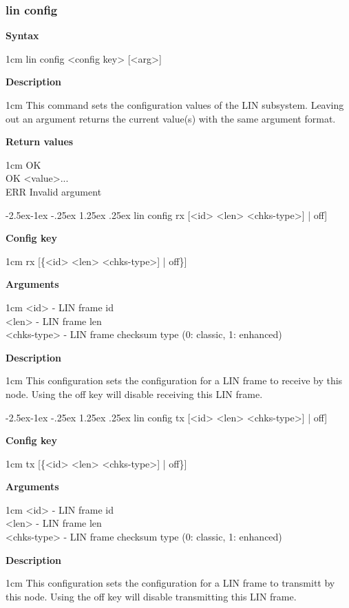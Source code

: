 \documentclass{article}[a4paper]
\makeatletter
\newcommand\subsubsubsection{\@startsection{paragraph}{4}{\z@}%
            {-2.5ex\@plus -1ex \@minus -.25ex}%
            {1.25ex \@plus .25ex}%
            {\normalfont\normalsize\bfseries}}
\makeatother
\begin{document}
\subsubsection{lin config}
\begin{tcolorbox}
	{\bf Syntax}

	 1cm \dimexpr\linewidth-2cm\relax
	lin config <config key> [<arg>]

	\medskip
	{\bf Description}

	 1cm \dimexpr\linewidth-2cm\relax
	This command sets the configuration values of the LIN subsystem.
	Leaving out an argument returns the current value(s) with the same argument
	format.

	\medskip
	{\bf Return values}

	 1cm \dimexpr\linewidth-2cm\relax
	OK \\
	OK <value>... \\
	ERR Invalid argument
\end{tcolorbox}

\subsubsubsection{lin config rx [<id> <len> <chks-type>] | off]}
\begin{tcolorbox}
	{\bf Config key}

	 1cm \dimexpr\linewidth-2cm\relax
	rx [\{<id> <len> <chks-type>] | off\}]

	\medskip
	{\bf Arguments}

	 1cm \dimexpr\linewidth-2cm\relax
	<id> - LIN frame id \\
	<len> - LIN frame len \\
	<chks-type> - LIN frame checksum type (0: classic, 1: enhanced)

	\medskip
	{\bf Description}

	 1cm \dimexpr\linewidth-2cm\relax
	This configuration sets the configuration for a LIN frame to receive by this
	node. Using the off key will disable receiving this LIN frame.
\end{tcolorbox}

\subsubsubsection{lin config tx [<id> <len> <chks-type>] | off]}
\begin{tcolorbox}
	{\bf Config key}

	 1cm \dimexpr\linewidth-2cm\relax
	tx [\{<id> <len> <chks-type>] | off\}]

	\medskip
	{\bf Arguments}

	 1cm \dimexpr\linewidth-2cm\relax
	<id> - LIN frame id \\
	<len> - LIN frame len \\
	<chks-type> - LIN frame checksum type (0: classic, 1: enhanced)

	\medskip
	{\bf Description}

	 1cm \dimexpr\linewidth-2cm\relax
	This configuration sets the configuration for a LIN frame to transmitt by this
	node. Using the off key will disable transmitting this LIN frame.
\end{tcolorbox}
\end{document}
